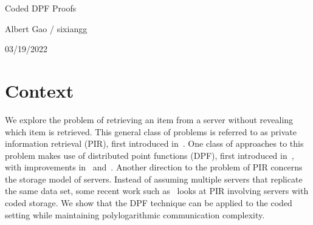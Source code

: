 \documentclass[11pt]{article}
\newcommand{\myinfo}{Albert Gao / sixiangg}
\newcommand{\currdate}{03/19/2022}
\begin{document}
\bigskip                        %

\thispagestyle{plain}
\begin{center}                  %
{\Huge Coded DPF Proofs}

\vspace{0.3cm}

\large{\myinfo}

\large{\currdate}

\end{center}

\section{Context}
We explore the problem of retrieving an item from a server without revealing which item is retrieved. This general class of problems is referred to as private information retrieval (PIR), first introduced in~\cite{chor95}. One class of approaches to this problem makes use of distributed point functions (DPF), first introduced in~\cite{gi14}, with improvements in~\cite{bgi15} and~\cite{bgi18}. Another direction to the problem of PIR concerns the storage model of servers. Instead of assuming multiple servers that replicate the same data set, some recent work such as~\cite{tajeddine19} looks at PIR involving servers with coded storage. We show that the DPF technique can be applied to the coded setting while maintaining polylogarithmic communication complexity.
\end{document}

